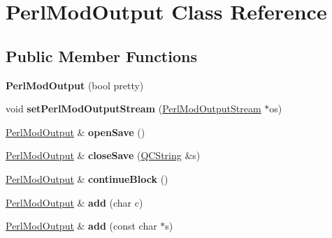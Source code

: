 \hypertarget{class_perl_mod_output}{}\section{Perl\+Mod\+Output Class Reference}
\label{class_perl_mod_output}
\subsection*{Public Member Functions}
\begin{DoxyCompactItemize}
\item 
\mbox{\label{class_perl_mod_output_a1a1ff2b3add5217939d7662474f59c57}} 
{\bfseries Perl\+Mod\+Output} (bool pretty)
\item 
\mbox{\label{class_perl_mod_output_ab7b0911db6dc14e1a4a12241484639d1}} 
void {\bfseries set\+Perl\+Mod\+Output\+Stream} (\mbox{\hyperlink{class_perl_mod_output_stream}{Perl\+Mod\+Output\+Stream}} $\ast$os)
\item 
\mbox{\label{class_perl_mod_output_a859c8d77099503b70e3e5650b318db85}} 
\mbox{\hyperlink{class_perl_mod_output}{Perl\+Mod\+Output}} \& {\bfseries open\+Save} ()
\item 
\mbox{\label{class_perl_mod_output_ae4e38b160261592855849e74361bb189}} 
\mbox{\hyperlink{class_perl_mod_output}{Perl\+Mod\+Output}} \& {\bfseries close\+Save} (\mbox{\hyperlink{class_q_c_string}{Q\+C\+String}} \&s)
\item 
\mbox{\label{class_perl_mod_output_ab38458a29d71feb99a35e4437f7ded42}} 
\mbox{\hyperlink{class_perl_mod_output}{Perl\+Mod\+Output}} \& {\bfseries continue\+Block} ()
\item 
\mbox{\label{class_perl_mod_output_ae8922b7e8560f4e86849f5bb1bf3a0fd}} 
\mbox{\hyperlink{class_perl_mod_output}{Perl\+Mod\+Output}} \& {\bfseries add} (char c)
\item 
\mbox{\label{class_perl_mod_output_ac88b0e912b838cf4e3ae64038fa46201}} 
\mbox{\hyperlink{class_perl_mod_output}{Perl\+Mod\+Output}} \& {\bfseries add} (const char $\ast$s)
\item 

\end{DoxyCompactItemize}
